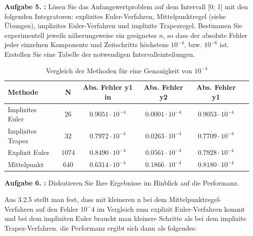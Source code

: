 \begin{mybox}
	\textbf{Aufgabe 5. :}	Lösen Sie das Anfangswertproblem auf dem Intervall [0; 1] mit den folgenden Integratoren: explizites
	Euler-Verfahren, Mittelpunktregel (siehe Übungen), implizites Euler-Verfahren und implizite
	Trapezregel. Bestimmen Sie experimentell jeweils näherungsweise ein geeignetes $n$, so dass der absolute Fehler jeder einzelnen Komponente und Zeitschritts höchstens $10^{-4}$, bzw. $10^{-6}$ ist.
	Erstellen Sie eine Tabelle der notwendigen Intervalleinteilungen.
\end{mybox}
\begin{table}
	\centering
	\caption{Vergleich der Methoden für eine Genauigkeit von $10^{-4}$}
	\label{t:fehler}
	\begin{tabular}{lccccc}
		\toprule
		
		Methode      & N  & Abs. Fehler y1 in  &     Abs. Fehler y2 & Abs. Fehler y1                   \\
		\midrule
		Implizites Euler  & $26$ & $0.9051\cdot10^{-4}$  & $0.0001\cdot10^{-4} $ &      $0.9053\cdot10^{-4}$        \\
		Implizites Trapez  & $32$ & $0.7972 \cdot10^{-4} $  & $0.0263\cdot10^{-4} $ &      $0.7709\cdot10^{-4}$        \\
		Explizit Euler  & $1074$ & $	0.8490\cdot10^{-4}  $  & $0.0561 \cdot10^{-4} $ &      $0.7928\cdot10^{-4}$        \\
      	Mittelpunkt  & $ 640 $ & $	0.6314\cdot10^{-4}  $  & $0.1866  \cdot10^{-4} $ &      $0.8180\cdot10^{-4}$        \\
	              
		\bottomrule
		
	\end{tabular}
\end{table}





\begin{mybox}
	\textbf{Aufgabe 6. :} Diskutieren Sie Ihre Ergebnisse im Hinblick auf die Performanz.
\end{mybox}


Aus 3.2.5 stellt man fest, dass mit kleineren n bei dem Mittelpunktregel-Verfahren auf den Fehler $ 10^-4 $ im Vergleich zum explizit Euler-Verfahren kommt und bei dem impliziten Euler braucht man kleinere Schritte als bei dem implizite Trapez-Verfahren. die Performanz ergibt sich dann als folgendes:

